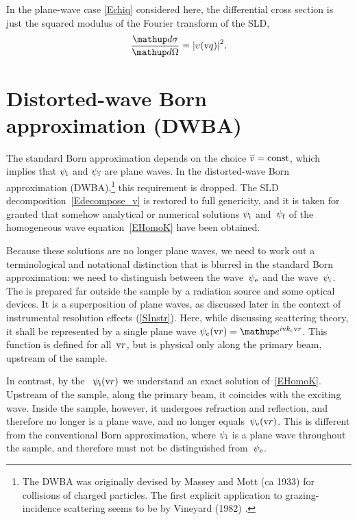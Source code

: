 In the plane-wave case \cref{Echiq} considered here,
the differential cross section is just the squared modulus
of the Fourier transform of the SLD,
%
\begin{equation}\label{Ecross1}
  \xElas
  = {\left| v(\q) \right|}^2.
\end{equation}

\section{Distorted-wave Born approximation (DWBA)}\label{SDWBA}

%
%

The standard Born approximation depends on the choice $\mv=\text{const}$,
which implies that $\psi_\si$ and $\psi_\sf$ are plane waves.
In the distorted-wave Born approximation (DWBA),\footnote{
The DWBA was originally devised by Massey and Mott (ca 1933)
for collisions of charged particles.
The first explicit application to grazing-incidence scattering
seems to be by Vineyard (1982) \cite{Vin82}.}
this requirement is dropped.
The SLD decomposition~\cref{Edecompose_v}
is restored to full genericity,
and it is taken for granted
that somehow analytical or numerical solutions $\psi_\si$ and~$\psi_\sf$
of the homogeneous wave equation~\cref{EHomoK}
have been obtained.

Because these solutions are no longer plane waves,
we need to work out a terminological and notational distinction
that is blurred in the standard Born approximation:
we need to distinguish
 between the  wave~$\psi_\se$
%
and the  wave~$\psi_\si$.
The 
%
%
is prepared far
outside the sample by a radiation source and some optical devices.
%
It is a superposition of plane waves,
as discussed later in the context of instrumental resolution effects
(\cref{SInstr}).
Here, while discussing scattering theory,
it shall be represented by a single plane wave
$\psi_\se(\r)=\e^{i\k_\se\r}$.
This function is defined for all~$\r$,
but is physical only along the primary beam, upstream of the sample.

In contrast, by the ~$\psi_\si(\r)$
%
%
%
we understand an exact solution of~\cref{EHomoK}.
Upstream of the sample, along the primary beam, it coincides with the exciting wave.
Inside the sample, however, it undergoes refraction and reflection,
and therefore no longer is a plane wave, and no longer equals~$\psi_\se(\r)$.
This is different from the conventional Born approximation,
where $\psi_\si$ is a plane wave throughout the sample,
and therefore must not be distinguished from~$\psi_\se$.

